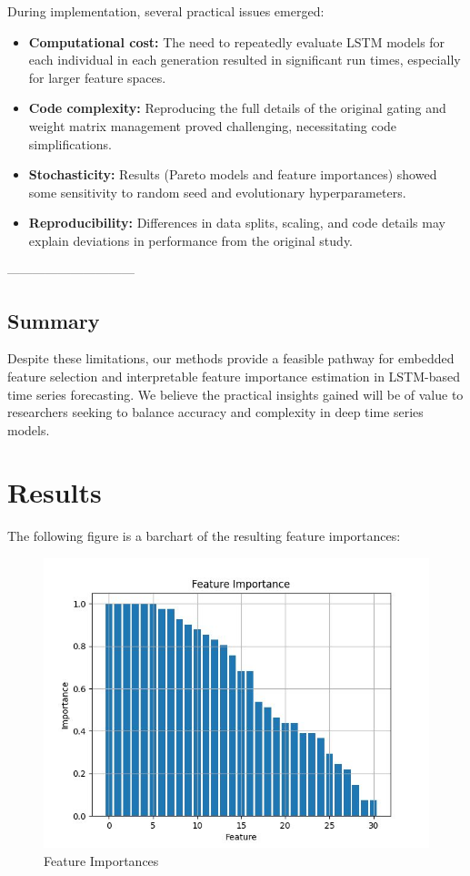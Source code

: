 \documentclass[12pt]{article}
\begin{document}
During implementation, several practical issues emerged:
\begin{itemize}
    \item \textbf{Computational cost:} The need to repeatedly evaluate LSTM models for each individual in each generation resulted in significant run times, especially for larger feature spaces.
    \item \textbf{Code complexity:} Reproducing the full details of the original gating and weight matrix management proved challenging, necessitating code simplifications.
    \item \textbf{Stochasticity:} Results (Pareto models and feature importances) showed some sensitivity to random seed and evolutionary hyperparameters.
    \item \textbf{Reproducibility:} Differences in data splits, scaling, and code details may explain deviations in performance from the original study.
\end{itemize}
------------------------------

\subsection{Summary}

Despite these limitations, our methods provide a feasible pathway for embedded feature selection and interpretable feature importance estimation in LSTM-based time series forecasting. We believe the practical insights gained will be of value to researchers seeking to balance accuracy and complexity in deep time series models.



\section{Results}
The following figure is a barchart of the resulting feature importances:
\begin{figure}[!h]
  \includegraphics[scale=0.75]{images/feat_imp_barchart.jpg}
  \caption{Feature Importances}
  \centering
  \label{fig:fimp}
\end{figure}
\end{document}
